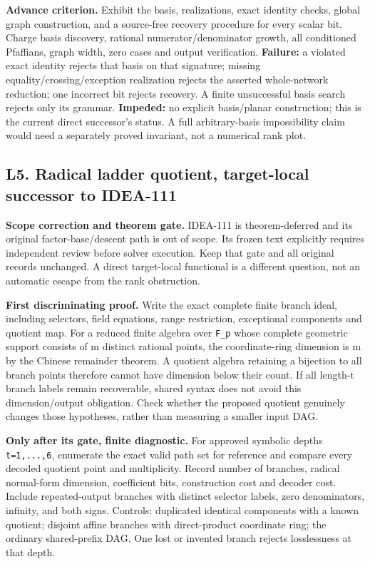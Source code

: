 \documentclass[
  10pt,
]{article}
\begin{document}
\textbf{Advance criterion.} Exhibit the basis, realizations, exact
identity checks, global graph construction, and a source-free recovery
procedure for every scalar bit. Charge basis discovery, rational
numerator/denominator growth, all conditioned Pfaffians, graph width,
zero cases and output verification. \textbf{Failure:} a violated exact
identity rejects that basis on that signature; missing
equality/crossing/exception realization rejects the asserted
whole-network reduction; one incorrect bit rejects recovery. A finite
unsuccessful basis search rejects only its grammar. \textbf{Impeded:} no
explicit basis/planar construction; this is the current direct
successor's status. A full arbitrary-basis impossibility claim would
need a separately proved invariant, not a numerical rank plot.

\subsection{L5. Radical ladder quotient, target-local successor to
IDEA-111}\label{l5.-radical-ladder-quotient-target-local-successor-to-idea-111}

\textbf{Scope correction and theorem gate.} IDEA-111 is theorem-deferred
and its original factor-base/descent path is out of scope. Its frozen
text explicitly requires independent review before solver execution.
Keep that gate and all original records unchanged. A direct target-local
functional is a different question, not an automatic escape from the
rank obstruction.

\textbf{First discriminating proof.} Write the exact complete finite
branch ideal, including selectors, field equations, range restriction,
exceptional components and quotient map. For a reduced finite algebra
over \texttt{F\_p} whose complete geometric support consists of m
distinct rational points, the coordinate-ring dimension is m by the
Chinese remainder theorem. A quotient algebra retaining a bijection to
all branch points therefore cannot have dimension below their count. If
all length-t branch labels remain recoverable, shared syntax does not
avoid this dimension/output obligation. Check whether the proposed
quotient genuinely changes those hypotheses, rather than measuring a
smaller input DAG.

\textbf{Only after its gate, finite diagnostic.} For approved symbolic
depths \texttt{t=1,...,6}, enumerate the exact valid path set for
reference and compare every decoded quotient point and multiplicity.
Record number of branches, radical normal-form dimension, coefficient
bits, construction cost and decoder cost. Include repeated-output
branches with distinct selector labels, zero denominators, infinity, and
both signs. Controls: duplicated identical components with a known
quotient; disjoint affine branches with direct-product coordinate ring;
the ordinary shared-prefix DAG. One lost or invented branch rejects
losslessness at that depth.
\end{document}
